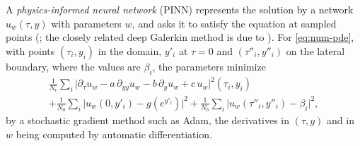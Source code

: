A \emph{physics-informed neural network} (PINN) represents the solution by a network $u_w(\tau,y)$
with parameters $w$, and asks it to satisfy the equation at sampled points
(\textcite{raissi-pinns}; the closely related deep Galerkin method is due to
\textcite{sirignano-spiliopoulos-2018}). For \eqref{eq:num-pde}, with points $(\tau_i,y_i)$ in the
domain, $y'_i$ at $\tau=0$ and $(\tau''_i,y''_i)$ on the lateral boundary, where the values are $\beta_i$,
the parameters minimize
\begin{multline*}
  \frac1{N_r}\sum_{i}\big|\partial_\tau u_w-a\,\partial_{yy}u_w-b\,\partial_yu_w+c\,u_w\big|^2(\tau_i,y_i)\\
  +\frac1{N_0}\sum_{i}\big|u_w(0,y'_i)-g(e^{y'_i})\big|^2
  +\frac1{N_b}\sum_{i}\big|u_w(\tau''_i,y''_i)-\beta_i\big|^2,
\end{multline*}
by a stochastic gradient method such as Adam, the derivatives in $(\tau,y)$ and in $w$ being computed
by automatic differentiation.

